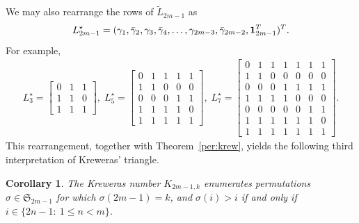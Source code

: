 \documentclass[11pt,reqno]{amsart}
\numberwithin{equation}{section}
\theoremstyle{plain}
\newtheorem{corollary}[theorem]{Corollary}
\theoremstyle{definition}
\renewcommand{\S}{\mathfrak{S}}
\def\ls{\leqslant}
\begin{document}
We may also rearrange the rows of $\tilde{L}_{2m-1}$ as
$$
L^{\star}_{2m-1}=(\gamma_1,\bar\gamma_2,\gamma_3,\bar\gamma_4,\ldots,\gamma_{2m-3},\bar\gamma_{2m-2},{\bf1}^T_{2m-1})^T.
$$
For example,
\begin{align*}
L^{\star}_3=\begin{bmatrix}
0 & 1 & 1\\
1 & 1 & 0 \\
1 & 1 & 1
\end{bmatrix},
\;
L^{\star}_5=\begin{bmatrix}
0 & 1 & 1 & 1 & 1\\
1 & 1 & 0 & 0 & 0\\
0 & 0 & 0 & 1 & 1\\
1 & 1 & 1 & 1 & 0\\
1 & 1 & 1 & 1 & 1
\end{bmatrix},
\;
L^{\star}_7=\begin{bmatrix}
0 & 1 & 1 & 1 & 1 & 1 & 1\\
1 & 1 & 0 & 0 & 0 & 0 & 0\\
0 & 0 & 0 & 1 & 1 & 1 & 1\\
1 & 1 & 1 & 1 & 0 & 0 & 0\\
0 & 0 & 0 & 0 & 0 & 1 & 1\\
1 & 1 & 1 & 1 & 1 & 1 & 0\\
1 & 1 & 1 & 1 & 1 & 1 & 1
\end{bmatrix}.
\end{align*}
This rearrangement, together with Theorem~\ref{per:krew}, yields the following third interpretation of Kreweras' triangle.

\begin{corollary}\label{int3:krew}
 The Kreweras number  $K_{2m-1,k}$ enumerates permutations $\sigma\in\S_{2m-1}$
 for which $\sigma(2m-1)=k$, and $\sigma(i)>i$ if and only if $i\in\{2n-1:\ 1\ls n<m\}$.
\end{corollary}
\end{document}
